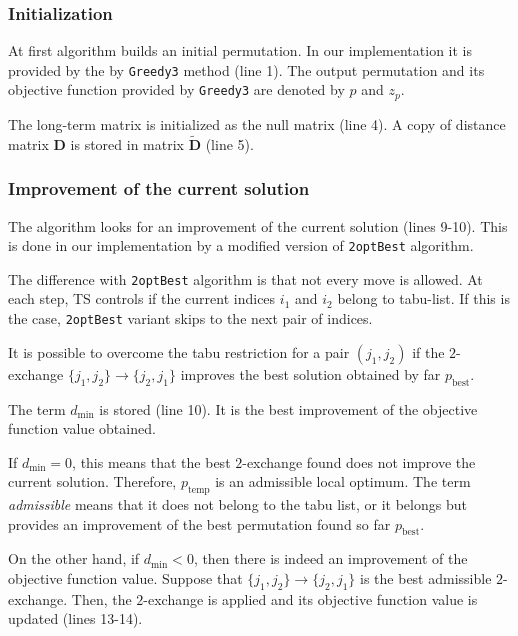 \subsubsection{Initialization}%


At first algorithm builds an initial permutation. In our implementation it is provided by the by \texttt{Greedy3} method (line 1). The output permutation and its objective function provided by \texttt{Greedy3}  are denoted by $p$ and $z_p$.
 
 The long-term matrix is initialized as the null matrix (line 4).
 A copy of distance matrix $\bm D$ is stored in matrix $\tilde{\bm D}$ (line 5).

\subsubsection{Improvement of the current solution}


The algorithm looks for an improvement of the current solution (lines 9-10). This is done in our implementation by a modified version of \texttt{2optBest} algorithm. 



The difference with \texttt{2optBest} algorithm is that not every move is allowed. At each step, TS controls if the current indices $i_1$ and $i_2$ belong to tabu-list. If this is the case, \texttt{2optBest} variant skips to the next pair of indices.

It is possible to overcome the tabu restriction for a pair $(j_1,j_2)$ if the $2$-exchange $\{j_1,j_2\}\to \{j_2,j_1\}$ improves the best solution  obtained by far $p_\mathrm{best}$.  

The term $d_\mathrm{min}$ is stored (line 10). It is the best improvement of the objective function value obtained.

If $d_\mathrm{min}=0$, this means that the best $2$-exchange found does not improve the current solution. Therefore, $p_\mathrm{temp}$ is an admissible local optimum. The term \textit{admissible} means that it does not belong to the tabu list, or it belongs but provides an improvement of the best permutation found so far $p_\mathrm{best}$.

On the other hand, if $d_\mathrm{min}<0$, then there is indeed an improvement of the objective function value.
Suppose that $\{j_1,j_2\}\to \{j_2,j_1\}$ is the best  admissible $2$-exchange. Then, the $2$-exchange is applied and its objective function value is updated (lines 13-14).

